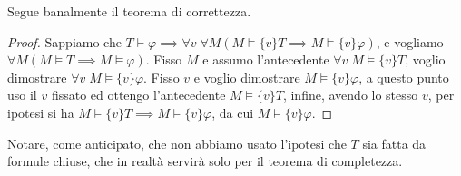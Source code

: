 Segue banalmente il teorema di correttezza.

\begin{proof}
    Sappiamo che $T \vdash \varphi \implies \forall v \; \forall M (M \models \{v\}T \implies M \models \{v\}\varphi)$, e vogliamo $\forall M (M \models T \implies M \models \varphi)$. 
    Fisso $M$ e assumo l'antecedente $\forall v \; M \models \{v\}T$, voglio dimostrare $\forall v \; M \models \{v\}\varphi$. Fisso $v$ e voglio dimostrare $M \models \{v\}\varphi$, a questo punto uso il $v$ fissato ed ottengo l'antecedente $M \models \{v\}T$,
    infine, avendo lo stesso $v$, per ipotesi si ha $M \models \{v\}T \implies M \models \{v\}\varphi$, da cui $M \models \{v\}\varphi$.
\end{proof}

\begin{remark}
    Notare, come anticipato, che non abbiamo usato l'ipotesi che $T$ sia fatta da formule chiuse, che in realtà servirà solo per il teorema di completezza.
\end{remark}

